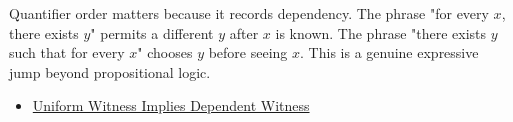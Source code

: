\begin{remark*}[Exposition]
Quantifier order matters because it records dependency. The phrase "for every
\(x\), there exists \(y\)" permits a different \(y\) after \(x\) is known. The
phrase "there exists \(y\) such that for every \(x\)" chooses \(y\) before
seeing \(x\). This is a genuine expressive jump beyond propositional logic.
\end{remark*}

\begin{dependencies}
\begin{itemize}
  \item \hyperref[thm:uniform-witness-implies-dependent-witness]{Uniform Witness Implies Dependent Witness}
\end{itemize}
\end{dependencies}
